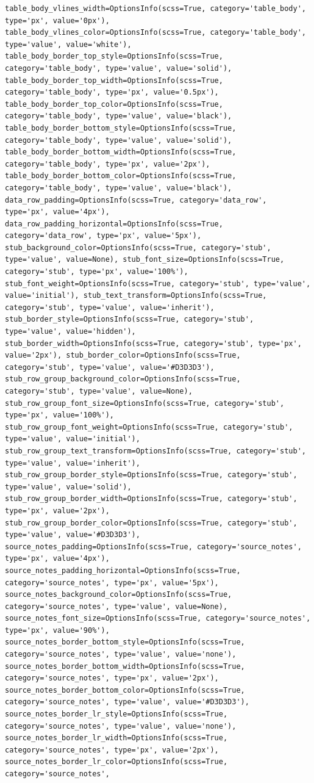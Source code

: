 \documentclass[
  letterpaper,
  DIV=11,
  numbers=noendperiod]{scrreprt}
\newcounter{none} %
\begin{document}
\begin{verbatim}
table_body_vlines_width=OptionsInfo(scss=True, category='table_body', type='px', value='0px'), table_body_vlines_color=OptionsInfo(scss=True, category='table_body', type='value', value='white'), table_body_border_top_style=OptionsInfo(scss=True, category='table_body', type='value', value='solid'), table_body_border_top_width=OptionsInfo(scss=True, category='table_body', type='px', value='0.5px'), table_body_border_top_color=OptionsInfo(scss=True, category='table_body', type='value', value='black'), table_body_border_bottom_style=OptionsInfo(scss=True, category='table_body', type='value', value='solid'), table_body_border_bottom_width=OptionsInfo(scss=True, category='table_body', type='px', value='2px'), table_body_border_bottom_color=OptionsInfo(scss=True, category='table_body', type='value', value='black'), data_row_padding=OptionsInfo(scss=True, category='data_row', type='px', value='4px'), data_row_padding_horizontal=OptionsInfo(scss=True, category='data_row', type='px', value='5px'), stub_background_color=OptionsInfo(scss=True, category='stub', type='value', value=None), stub_font_size=OptionsInfo(scss=True, category='stub', type='px', value='100%'), stub_font_weight=OptionsInfo(scss=True, category='stub', type='value', value='initial'), stub_text_transform=OptionsInfo(scss=True, category='stub', type='value', value='inherit'), stub_border_style=OptionsInfo(scss=True, category='stub', type='value', value='hidden'), stub_border_width=OptionsInfo(scss=True, category='stub', type='px', value='2px'), stub_border_color=OptionsInfo(scss=True, category='stub', type='value', value='#D3D3D3'), stub_row_group_background_color=OptionsInfo(scss=True, category='stub', type='value', value=None), stub_row_group_font_size=OptionsInfo(scss=True, category='stub', type='px', value='100%'), stub_row_group_font_weight=OptionsInfo(scss=True, category='stub', type='value', value='initial'), stub_row_group_text_transform=OptionsInfo(scss=True, category='stub', type='value', value='inherit'), stub_row_group_border_style=OptionsInfo(scss=True, category='stub', type='value', value='solid'), stub_row_group_border_width=OptionsInfo(scss=True, category='stub', type='px', value='2px'), stub_row_group_border_color=OptionsInfo(scss=True, category='stub', type='value', value='#D3D3D3'), source_notes_padding=OptionsInfo(scss=True, category='source_notes', type='px', value='4px'), source_notes_padding_horizontal=OptionsInfo(scss=True, category='source_notes', type='px', value='5px'), source_notes_background_color=OptionsInfo(scss=True, category='source_notes', type='value', value=None), source_notes_font_size=OptionsInfo(scss=True, category='source_notes', type='px', value='90%'), source_notes_border_bottom_style=OptionsInfo(scss=True, category='source_notes', type='value', value='none'), source_notes_border_bottom_width=OptionsInfo(scss=True, category='source_notes', type='px', value='2px'), source_notes_border_bottom_color=OptionsInfo(scss=True, category='source_notes', type='value', value='#D3D3D3'), source_notes_border_lr_style=OptionsInfo(scss=True, category='source_notes', type='value', value='none'), source_notes_border_lr_width=OptionsInfo(scss=True, category='source_notes', type='px', value='2px'), source_notes_border_lr_color=OptionsInfo(scss=True, category='source_notes', 
\end{verbatim}
\end{document}
